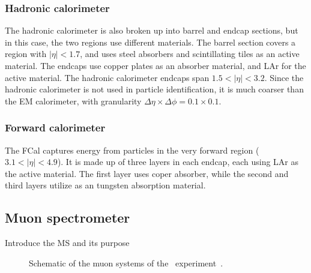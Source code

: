 \FloatBarrier
\subsubsection{Hadronic calorimeter} 
\label{sec:hcal}

The hadronic calorimeter is also broken up into barrel and endcap sections, but
in this case, the two regions use different materials.
The barrel section covers a region with $|\eta| < 1.7$, and uses steel
absorbers and scintillating tiles as an active material.
The endcaps use copper plates as an absorber material, and LAr for the active
material.
The hadronic calorimeter endcaps span $1.5 < |\eta| < 3.2$.
Since the hadronic calorimeter is not used in particle identification, it is
much coarser than the EM calorimeter, with granularity
$\Delta\eta \times \Delta\phi = 0.1 \times 0.1$.

\FloatBarrier
\subsubsection{Forward calorimeter} 
\label{sec:fcal}

The FCal captures energy from particles in the very forward region
($3.1 < |\eta| < 4.9$).
It is made up of three layers in each endcap, each using LAr as the active
material.
The first layer uses coper absorber, while the second and third layers utilize
as an tungsten absorption material.

\FloatBarrier
\subsection{Muon spectrometer} 
\label{sec:ms}

{\color{red} Introduce the MS and its purpose}

\begin{figure}[ht]
  \caption{
    Schematic of the muon systems of the
    \atlas\ experiment~\cite{Pequenao:1095929}.
  }
  \label{fig:ms_cartoon}
\end{figure}


